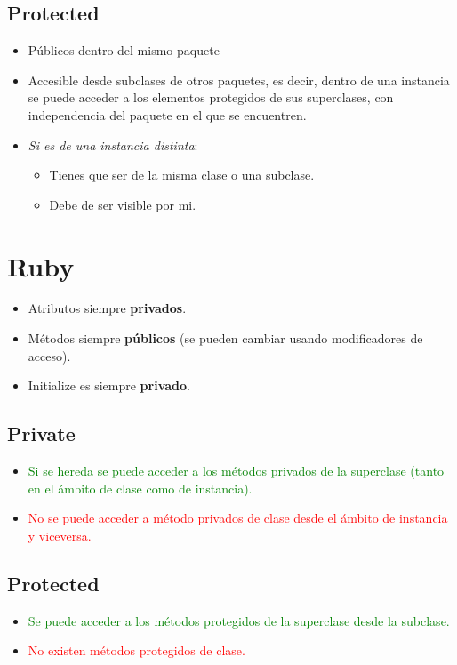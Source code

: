 \documentclass[a4paper,12pt]{article}
\begin{document}
\subsection{Protected}
\begin{itemize}
    \item Públicos dentro del mismo paquete
    \item Accesible desde subclases de otros paquetes, es decir, dentro de una instancia se puede acceder a los elementos protegidos de sus superclases, con independencia del paquete en el que se encuentren.
    \item \textit{Si es de una instancia distinta}:
    \begin{itemize}
        \item Tienes que ser de la misma clase o una subclase.
        \item Debe de ser visible por mi.
    \end{itemize}
\end{itemize}


\section{Ruby}

\begin{itemize}
    \item Atributos siempre \textbf{privados}.
    \item Métodos siempre \textbf{públicos} (se pueden cambiar usando modificadores de acceso).
    \item Initialize es siempre \textbf{privado}.
\end{itemize}

\subsection{Private}
\begin{itemize}
    \item \textcolor{green}{Si se hereda se puede acceder a los métodos privados de la superclase (tanto en el ámbito de clase como de instancia).}
    \item \textcolor{red}{No se puede acceder a método privados de clase desde el ámbito de instancia y viceversa.}
\end{itemize}

\subsection{Protected}
\begin{itemize}
    \item \textcolor{green}{Se puede acceder a los métodos protegidos de la superclase desde la subclase.}
    \item \textcolor{red}{No existen métodos protegidos de clase.}
\end{itemize}
\end{document}
